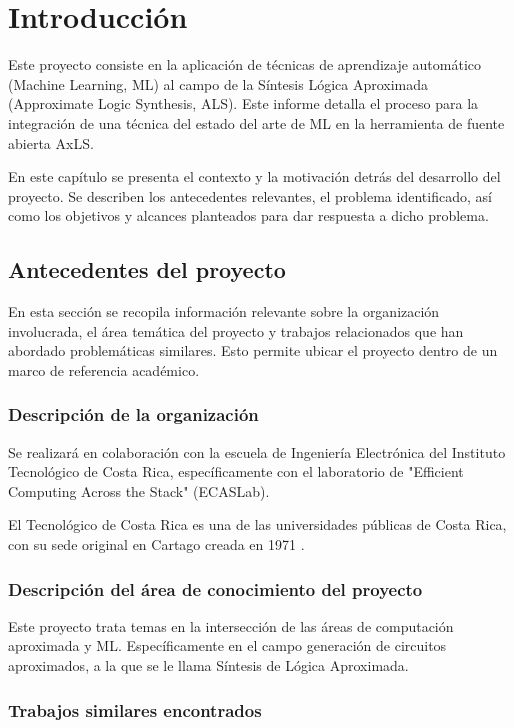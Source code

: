 \chapter{Introducción}

Este proyecto consiste en la aplicación de técnicas de aprendizaje automático
(Machine Learning, ML) al campo de la Síntesis Lógica Aproximada (Approximate
Logic Synthesis, ALS).
Este informe detalla el proceso para la integración de una técnica del estado del
arte de ML en la herramienta de fuente abierta AxLS.

En este capítulo se presenta el contexto y la motivación detrás del desarrollo del
proyecto. Se describen los antecedentes relevantes, el problema identificado,
así como los objetivos y alcances planteados para dar respuesta a dicho
problema.

\section{Antecedentes del proyecto}

En esta sección se recopila información relevante sobre la organización
involucrada, el área temática del proyecto y trabajos relacionados que han
abordado problemáticas similares. Esto permite ubicar el proyecto dentro de un
marco de referencia académico.

\subsection{Descripción de la organización}

Se realizará en colaboración con la escuela de Ingeniería Electrónica del
Instituto Tecnológico de Costa Rica, específicamente con el laboratorio de
"Efficient Computing Across the Stack" (ECASLab).

El Tecnológico de Costa Rica es una de las universidades públicas de Costa
Rica, con su sede original en Cartago creada en 1971 \cite{resena_tec}.

\subsection{Descripción del área de conocimiento del proyecto}

Este proyecto trata temas en la intersección de las áreas de computación
aproximada y ML.
Específicamente en el campo generación de circuitos aproximados, a la
que se le llama Síntesis de Lógica Aproximada.

\subsection{Trabajos similares encontrados}


